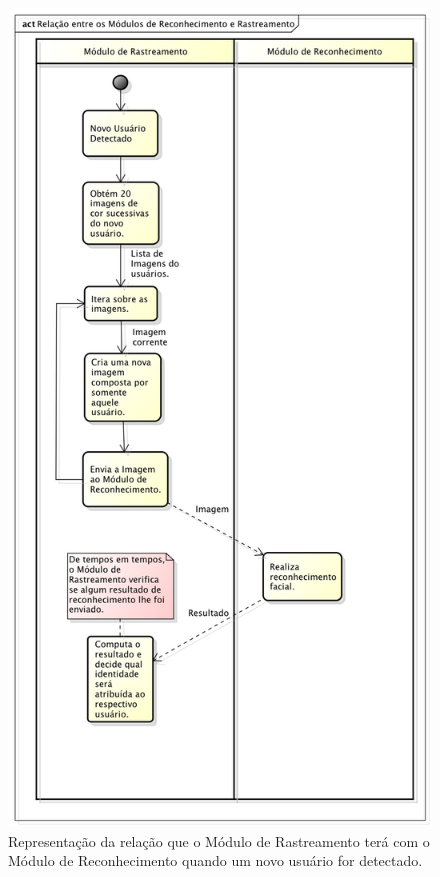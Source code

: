 		\begin{figure}[hbt]
			\begin{center}
				\includegraphics[scale=0.5]{figuras/4.ProblemaEProposta/diagrama-relacao.png}
			\end{center}
			\caption{Representação da relação que o Módulo de Rastreamento terá com o Módulo de Reconhecimento quando um novo usuário for detectado.}
			\label{fig:rastreamento-reconhecimento}
		\end{figure}
	
